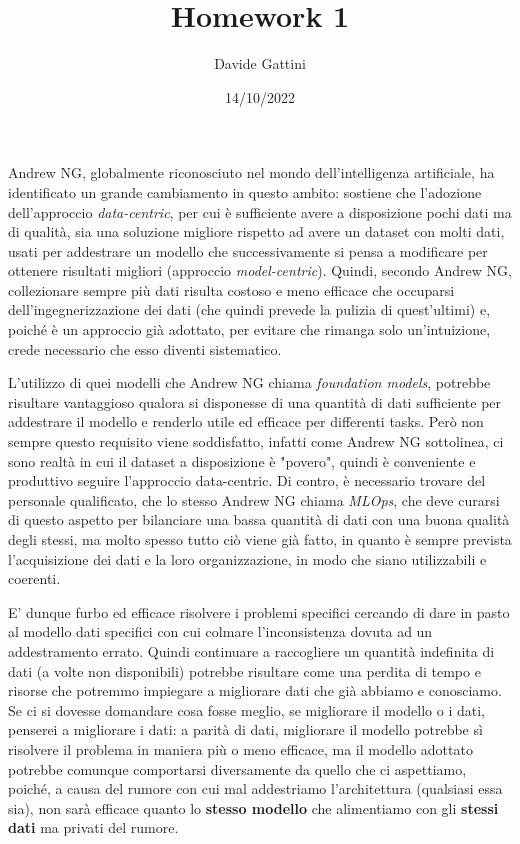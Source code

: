 \documentclass{article}
\begin{document}
\title{Homework 1}
\author{Davide Gattini}
\date{14/10/2022}
\maketitle

Andrew NG, globalmente riconosciuto nel mondo dell'intelligenza artificiale, ha identificato un grande cambiamento in questo ambito: sostiene che l'adozione dell'approccio \textit{data-centric}, per cui è sufficiente avere a disposizione pochi dati ma di qualità, sia una soluzione migliore rispetto ad avere un dataset con molti dati, usati per addestrare un modello che successivamente si pensa a modificare per ottenere risultati migliori (approccio \textit{model-centric}). Quindi, secondo Andrew NG, collezionare sempre più dati risulta costoso e meno efficace che occuparsi dell'ingegnerizzazione dei dati (che quindi prevede la pulizia di quest'ultimi) e, poiché è un approccio già adottato, per evitare che rimanga solo un'intuizione, crede necessario che esso diventi sistematico.


L'utilizzo di quei modelli che Andrew NG chiama \textit{foundation models}, potrebbe risultare vantaggioso qualora si disponesse di una quantità di dati sufficiente per addestrare il modello e renderlo utile ed efficace per differenti tasks. Però non sempre questo requisito viene soddisfatto, infatti come Andrew NG sottolinea, ci sono realtà in cui il dataset a disposizione è "povero", quindi è conveniente e produttivo seguire l'approccio data-centric. Di contro, è necessario trovare del personale qualificato, che lo stesso Andrew NG chiama \textit{MLOps}, che deve curarsi di questo aspetto per bilanciare una bassa quantità di dati con una buona qualità degli stessi, ma molto spesso tutto ciò viene già fatto, in quanto è sempre prevista l'acquisizione dei dati e la loro organizzazione, in modo che siano utilizzabili e coerenti.

E' dunque furbo ed efficace risolvere i problemi specifici cercando di dare in pasto al modello dati specifici con cui colmare l'inconsistenza dovuta ad un addestramento errato. Quindi continuare a raccogliere un quantità indefinita di dati (a volte non disponibili) potrebbe risultare come una perdita di tempo e risorse che potremmo impiegare a migliorare dati che già abbiamo e conosciamo. Se ci si dovesse domandare cosa fosse meglio, se migliorare il modello o i dati, penserei a migliorare i dati: a parità di dati, migliorare il modello potrebbe sì risolvere il problema in maniera più o meno efficace, ma il modello adottato potrebbe comunque comportarsi diversamente da quello che ci aspettiamo, poiché, a causa del rumore con cui mal addestriamo l'architettura (qualsiasi essa sia), non sarà efficace quanto lo \textbf{stesso modello} che alimentiamo con gli \textbf{stessi dati} ma privati del rumore.
\end{document}
